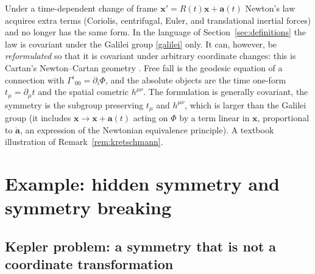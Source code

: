 Under a time-dependent change of frame ${\bm{x}}'=R(t){\bm{x}}+\bm a(t)$ Newton's law
acquires extra terms (Coriolis, centrifugal, Euler, and translational
inertial forces) and no longer has the same form. In the language of
Section~\ref{sec:definitions} the law is covariant under the Galilei group
\eqref{galilei} only. It can, however, be \emph{reformulated} so that it is
covariant under arbitrary coordinate changes: this is Cartan's
Newton--Cartan geometry \cite{cartan,dbkp}. Free fall is the geodesic equation
of a connection with $\Gamma^i{}_{00}=\partial_i\Phi$, and the absolute
objects are the time one-form $t_\mu=\partial_\mu t$ and the spatial
cometric $h^{\mu\nu}$. The formulation is generally covariant, the symmetry
is the subgroup preserving $t_\mu$ and $h^{\mu\nu}$, which is larger than the
Galilei group (it includes ${\bm{x}}\to{\bm{x}}+\bm a(t)$ acting on $\Phi$ by a term
linear in ${\bm{x}}$, proportional to $\ddot{\bm a}$, an expression of the
Newtonian equivalence principle). A textbook illustration of
Remark~\ref{rem:kretschmann}.

\section{Example: hidden symmetry and symmetry breaking}
\label{sec:kepler}

\subsection{Kepler problem: a symmetry that is not a coordinate transformation}

